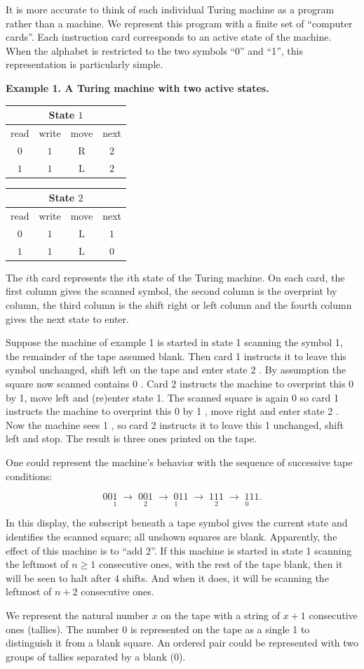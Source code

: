 \documentclass[11pt]{article}
\makeatletter
\newcommand{\card}[7]{%
\begingroup\setlength{\tabcolsep}{4.1pt}\renewcommand{\arraystretch}{1.13}%
\begin{tabular}{@{}c|ccc@{}}\multicolumn{4}{c}{\textbf{State $#1$}}\\
\toprule
\scriptsize read & \scriptsize write & \scriptsize move & \scriptsize next\\
\midrule
$0$ & $#2$ & $\mathrm{#3}$ & $#4$\\
$1$ & $#5$ & $\mathrm{#6}$ & $#7$\\
\bottomrule
\end{tabular}\endgroup}
\makeatother
\begin{document}
It is more accurate to think of each individual Turing machine as a program rather than a machine. We represent this program with a finite set of ``computer cards''. Each instruction card corresponds to an active state of the machine. When the alphabet is restricted to the two symbols ``0'' and ``1'', this representation is particularly simple.

\begin{center}
\textbf{Example 1. A Turing machine with two active states.}\par\smallskip
\card{1}{1}{R}{2}{1}{L}{2}\qquad
\card{2}{1}{L}{1}{1}{L}{0}
\end{center}

The $i$th card represents the $i$th state of the Turing machine. On each card, the first column gives the scanned symbol, the second column is the overprint by column, the third column is the shift right or left column and the fourth column gives the next state to enter.

Suppose the machine of example 1 is started in state 1 scanning the symbol 1, the remainder of the tape assumed blank. Then card 1 instructs it to leave this symbol unchanged, shift left on the tape and enter state 2 . By assumption the square now scanned contains 0 . Card 2 instructs the machine to overprint this 0 by 1, move left and (re)enter state 1. The scanned square is again 0 so card 1 instructs the machine to overprint this 0 by 1 , move right and enter state 2 . Now the machine sees 1 , so card 2 instructs it to leave this 1 unchanged, shift left and stop. The result is three ones printed on the tape.

One could represent the machine's behavior with the sequence of successive tape conditions:

\[
00\underset{1}{1}\;\longrightarrow\;
0\underset{2}{0}1\;\longrightarrow\;
\underset{1}{0}11\;\longrightarrow\;
1\underset{2}{1}1\;\longrightarrow\;
\underset{0}{1}11.
\]

In this display, the subscript beneath a tape symbol gives the current state and identifies the scanned square; all unshown squares are blank. Apparently, the effect of this machine is to ``add 2''. If this machine is started in state 1 scanning the leftmost of $n\geq 1$ consecutive ones, with the rest of the tape blank, then it will be seen to halt after 4 shifts. And when it does, it will be scanning the leftmost of $n+2$ consecutive ones.

We represent the natural number $x$ on the tape with a string of $x+1$ consecutive ones (tallies). The number 0 is represented on the tape as a single 1 to distinguish it from a blank square. An ordered pair could be represented with two groups of tallies separated by a blank (0).
\end{document}
